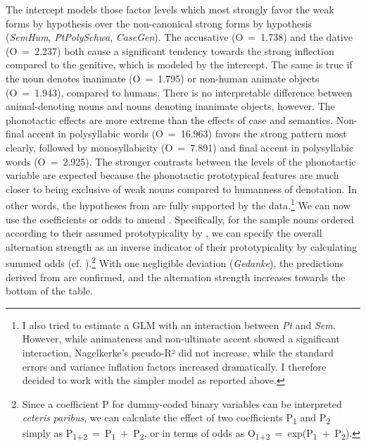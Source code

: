 \begin{styleMoutonText}
The intercept models those factor levels which most strongly favor the weak forms by hypothesis over the non-canonical strong forms by hypothesis (\textit{SemHum}, \textit{PtPolySchwa}, \textit{CaseGen}). The accusative (O~=~1.738) and the dative (O~=~2.237) both cause a significant tendency towards the strong inflection compared to the genitive, which is modeled by the intercept. The same is true if the noun denotes inanimate (O~=~1.795) or non-human animate objects (O~=~1.943), compared to humans. There is no interpretable difference between animal-denoting nouns and nouns denoting inanimate objects, however. The phonotactic effects are more extreme than the effects of case and semantics. Non-final accent in polysyllabic words (O~=~16.963) favors the strong pattern most clearly, followed by monosyllabicity (O~=~7.891) and final accent in polysyllabic words (O~=~2.925). The stronger contrasts between the levels of the phonotactic variable are expected because the phonotactic prototypical features are much closer to being exclusive of weak nouns compared to humanness of denotation. In other words, the hypotheses from  are fully supported by the data.\footnote{I also tried to estimate a GLM with an interaction between \textit{Pt} and \textit{Sem}. However, while animateness and non-ultimate accent showed a significant interaction, Nagelkerke’s pseudo-R² did not increase, while the standard errors and variance inflation factors increased dramatically. I therefore decided to work with the simpler model as reported above.} We can now use the coefficients or odds to amend . Specifically, for the sample nouns ordered according to their assumed prototypicality by \citet[178]{Köpcke1995}, we can specify the overall alternation strength as an inverse indicator of their prototypicality by calculating summed odds (cf. ).\footnote{Since a coefficient P for dummy-coded binary variables can be interpreted \textit{ceteris} \textit{paribus}, we can calculate the effect of two coefficients P\textsubscript{1} and P\textsubscript{2} simply as P\textsubscript{1+2}~=~P\textsubscript{1}~+~P\textsubscript{2}, or in terms of odds as O\textsubscript{1+2}~=~exp(P\textsubscript{1}~+~P\textsubscript{2}).} With one negligible deviation (\textit{Gedanke}), the predictions derived from \citet{Köpcke1995} are confirmed, and the alternation strength increases towards the bottom of the table.
\end{styleMoutonText}


